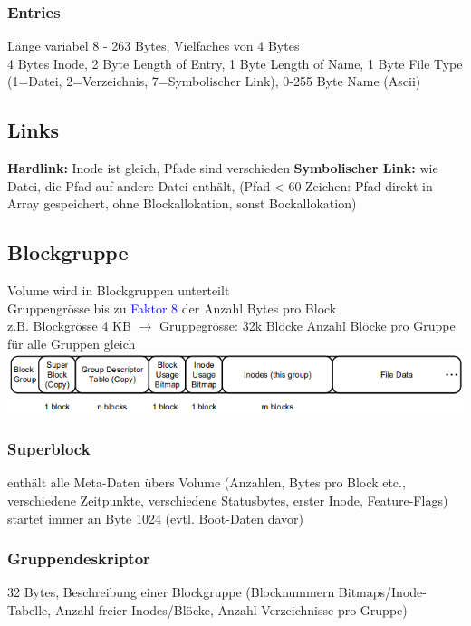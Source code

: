 \subsubsection{Entries}
Länge variabel 8 - 263 Bytes, Vielfaches von 4 Bytes\\
4 Bytes Inode, 2 Byte Length of Entry, 1 Byte Length of Name, 1 Byte File Type (1=Datei, 2=Verzeichnis, 7=Symbolischer Link), 0-255 Byte Name (Ascii) 

\subsection{Links}
\textbf{Hardlink: }Inode ist gleich, Pfade sind verschieden
\textbf{Symbolischer Link: }wie Datei, die Pfad auf andere Datei enthält, (Pfad < 60 Zeichen: Pfad direkt in Array gespeichert, ohne Blockallokation, sonst Bockallokation)

\subsection{Blockgruppe}
Volume wird in Blockgruppen unterteilt\\
Gruppengrösse bis zu \textcolor{blue}{Faktor 8} der Anzahl Bytes pro Block\\
z.B. Blockgrösse 4 KB $\rightarrow$ Gruppegrösse: 32k Blöcke
Anzahl Blöcke pro Gruppe für alle Gruppen gleich\\
\includegraphics[scale = 0.4]{grafiken/blockgruppe.PNG}

\subsubsection{Superblock}
enthält alle Meta-Daten übers Volume (Anzahlen, Bytes pro Block etc., verschiedene Zeitpunkte, verschiedene Statusbytes, erster Inode, Feature-Flags)\\
startet immer an Byte 1024 (evtl. Boot-Daten davor)

\subsubsection{Gruppendeskriptor}
32 Bytes, Beschreibung einer Blockgruppe (Blocknummern Bitmaps/Inode-Tabelle, Anzahl freier Inodes/Blöcke, Anzahl Verzeichnisse pro Gruppe)

